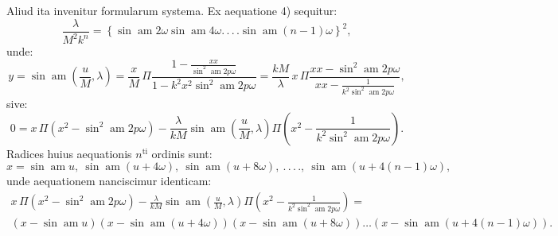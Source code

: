 \documentclass{article}
\begin{document}
Aliud ita invenitur formularum systema. Ex aequatione 4) sequitur:
\[
\frac{\lambda}{M^{2}k^{n}}=\left\{\sin\operatorname{am}2\omega\sin\operatorname{am}4\omega.\,.\,.\,.\sin\operatorname{am}(n-1)\omega\right\}^{2},
\]
unde:
\[
y=\sin\operatorname{am}\left(\frac{u}{M},\lambda\right)=\frac{x}{M}\,\Pi\frac{1-\frac{xx}{\sin^{2}\operatorname{am}2p\omega}}{1-k^{2}x^{2}\sin^{2}\operatorname{am}2p\omega}=\frac{kM}{\lambda}\,x\,\Pi\frac{xx-\sin^{2}\operatorname{am}2p\omega}{xx-\frac{1}{k^{2}\sin^{2}\operatorname{am}2p\omega}},
\]
sive:
\[
0=x\,\Pi\left(x^{2}-\sin^{2}\operatorname{am}2p\omega\right)-\frac{\lambda}{kM}\sin\operatorname{am}\left(\frac{u}{M},\lambda\right)\Pi\left(x^{2}-\frac{1}{k^{2}\sin^{2}\operatorname{am}2p\omega}\right).
\]
Radices huius aequationis $n^{\mathrm{ti}}$ ordinis sunt:
\[
x=\sin\operatorname{am}u,\ \sin\operatorname{am}(u+4\omega),\ \sin\operatorname{am}(u+8\omega),\ .\,.\,.\,.,\ \sin\operatorname{am}(u+4(n-1)\omega),
\]
unde aequationem nanciscimur identicam:
\[
\begin{gathered}
x\,\Pi\left(x^{2}-\sin^{2}\operatorname{am}2p\omega\right)-\frac{\lambda}{kM}\sin\operatorname{am}\left(\frac{u}{M},\lambda\right)\Pi\left(x^{2}-\frac{1}{k^{2}\sin^{2}\operatorname{am}2p\omega}\right)=\\[1.5ex]
\left(x-\sin\operatorname{am}u\right)\left(x-\sin\operatorname{am}(u+4\omega)\right)\left(x-\sin\operatorname{am}(u+8\omega)\right)\ldots\left(x-\sin\operatorname{am}(u+4(n-1)\omega)\right).
\end{gathered}
\]
\end{document}
